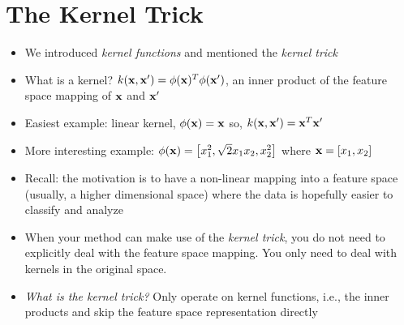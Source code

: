 \documentclass[12pt,letterpaper]{article}
\begin{document}
\section{The Kernel Trick}
\begin{itemize}
\item We introduced \emph{kernel functions} and mentioned the \emph{kernel trick}
\item What is a kernel? $k(\mathbf{x}, \mathbf{x}') = \phi(\mathbf{x})^T\phi(\mathbf{x}')$, an inner product of the feature space mapping of $\mathbf{x}$ and $\mathbf{x}'$
\item Easiest example: linear kernel, $\phi(\mathbf{x})=\mathbf{x}$ so, $k(\mathbf{x},\mathbf{x}') = \mathbf{x}^T\mathbf{x}'$
\item More interesting example: $\phi(\mathbf{x}) = \left[x_1^2, \sqrt{2}x_1x_2, x_2^2 \right]$ where $\mathbf{x} = [x_1, x_2]$

\item Recall: the motivation is to have a non-linear mapping into a feature space (usually, a higher dimensional space) where the data is hopefully easier to classify and analyze
\item When your method can make use of the \emph{kernel trick}, you do not need to explicitly deal with the feature space mapping.  You only need to deal with kernels in the original space. 
\item \emph{What is the kernel trick?} Only operate on kernel functions, i.e., the inner products and skip the feature space representation directly


\end{itemize}
\end{document}
